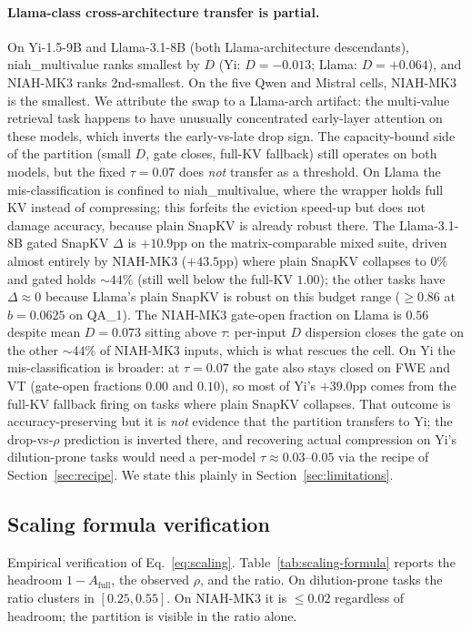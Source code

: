 \documentclass{article} %
\begin{document}
\paragraph{Llama-class cross-architecture transfer is partial.} On
Yi-1.5-9B and Llama-3.1-8B (both Llama-architecture descendants),
niah\_multivalue ranks smallest by $D$ (Yi: $D = -0.013$; Llama: $D =
+0.064$), and NIAH-MK3 ranks 2nd-smallest. On the five Qwen and
Mistral cells, NIAH-MK3 is the smallest. We attribute the swap to a
Llama-arch artifact: the multi-value retrieval task happens to have
unusually concentrated early-layer attention on these models, which
inverts the early-vs-late drop sign. The capacity-bound side of the
partition (small $D$, gate closes, full-KV fallback) still operates on
both models, but the fixed $\tau = 0.07$ does \emph{not} transfer as a
threshold. On Llama the mis-classification is confined to
niah\_multivalue, where the wrapper holds full KV instead of
compressing; this forfeits the eviction speed-up but does not damage
accuracy, because plain SnapKV is already robust there. The
Llama-3.1-8B gated SnapKV $\Delta$ is $+10.9$pp on the
matrix-comparable mixed suite, driven almost entirely by NIAH-MK3
($+43.5$pp) where plain SnapKV collapses to $0\%$ and gated holds
$\sim 44\%$ (still well below the full-KV $1.00$); the other tasks
have $\Delta \approx 0$ because Llama's plain SnapKV is robust on this
budget range ($\geq 0.86$ at $b = 0.0625$ on QA\_1). The NIAH-MK3
gate-open fraction on Llama is $0.56$ despite mean $D = 0.073$ sitting
above $\tau$: per-input $D$ dispersion closes the gate on the other
$\sim 44\%$ of NIAH-MK3 inputs, which is what rescues the cell. On Yi
the mis-classification is broader: at $\tau = 0.07$ the gate also
stays closed on FWE and VT (gate-open fractions $0.00$ and $0.10$), so
most of Yi's $+39.0$pp comes from the full-KV fallback firing on tasks
where plain SnapKV collapses. That outcome is accuracy-preserving but
it is \emph{not} evidence that the partition transfers to Yi; the
drop-vs-$\rho$ prediction is inverted there, and recovering actual
compression on Yi's dilution-prone tasks would need a per-model
$\tau \approx 0.03$--$0.05$ via the recipe of
Section~\ref{sec:recipe}. We state this plainly in
Section~\ref{sec:limitations}.

\subsection{Scaling formula verification}

Empirical verification of Eq.~\eqref{eq:scaling}. Table~\ref{tab:scaling-formula}
reports the headroom $1 - A_{\mathrm{full}}$, the observed $\rho$, and the
ratio. On dilution-prone tasks the ratio clusters in $[0.25, 0.55]$. On
NIAH-MK3 it is $\le 0.02$ regardless of headroom; the partition is
visible in the ratio alone.
\end{document}
